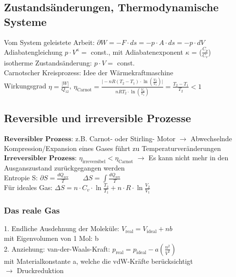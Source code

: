 \documentclass[fs, footer]{latex4ei}
\begin{document}
\begin{multicols*}{4}
\subsection{Zustandsänderungen, Thermodynamische Systeme}
Vom System geleistete Arbeit: $\partial W = -F \cdot ds = -p \cdot A \cdot ds = -p \cdot dV$\\
Adiabatengleichung $p\cdot V^\kappa =$ const., mit Adiabatenexponent $\kappa$ = ($\frac{C_p}{C_v}$)\\
isotherme Zustandsänderung: $p \cdot V =$ const.\\
Carnotscher Kreisprozess: Idee der Wärmekraftmaschine\\
Wirkungsgrad $\eta = \frac{\vert W\vert}{Q_{12}}$, $\eta_{\text{Carnot}} = \frac{\vert - n R(T_2-T_1)\cdot\ln(\frac{V_2}{V_1})\vert}{n RT_2\cdot\ln(\frac{V_2}{V_1})} = \frac{T_2-T_1}{T_2} < 1$\\
\subsection{Reversible und irreversible Prozesse}
$\textbf{Reversibler Prozess:}$ z.B. Carnot- oder Stirling- Motor $\rightarrow$ Abwechselnde Kompression/Expansion eines Gases führt zu Temperaturveränderungen %
$\textbf{Irreversibler Prozess:}$ $\eta_{\text{irreversibel}} < \eta_{\text{Carnot}}$ $\rightarrow$ Es kann nicht mehr in den Ausganszustand zurückgegangen werden\\

Entropie S: $\partial S = \frac{dQ_{\text{rev}}}{T} \qquad \Delta S = \int \frac{dQ_{\text{rev}}}{T}$\\
Für ideales Gas: $\Delta S = n\cdot C_v\cdot\ln\frac{T_2}{T_1} + n\cdot R\cdot\ln\frac{V_2}{V_1}$\\
\subsubsection{Das reale Gas}
1. Endliche Ausdehnung der Moleküle: $V_{\text{real}} = V_{\text{ideal}} + nb$\\ mit Eigenvolumen von 1 Mol: b\\
2. Anziehung: van-der-Waals-Kraft: $p_{\text{real}} = p_{\text{ideal}} - a(\frac{n^2}{V^2})$\\ mit Materialkonstante a, welche die vdW-Kräfte berücksichtigt \\$\rightarrow$ Druckreduktion\\


\end{multicols*}
\end{document}
